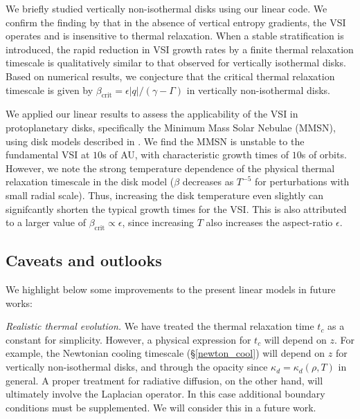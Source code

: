 We briefly studied vertically non-isothermal disks using our linear 
code. We confirm the finding by \cite{nelson13} that in the absence
of vertical entropy gradients, the VSI operates and is insensitive to
thermal relaxation. When a stable stratification is introduced, the
rapid reduction in VSI growth rates by a finite thermal relaxation
timescale is qualitatively similar to that observed for vertically
isothermal disks. Based on numerical results, we conjecture that the
critical thermal relaxation timescale is given by
$\beta_\mathrm{crit}=\epsilon|q|/(\gamma-\Gamma)$ in vertically 
non-isothermal disks.  


We applied our linear results to assess the applicability of the VSI in
protoplanetary disks, specifically the Minimum Mass Solar Nebulae (MMSN),
using disk models described in \cite{chiang10}. We find the MMSN is
unstable to the fundamental VSI at $10$s of AU, with characteristic
growth times of $10$s of orbits. However, we note the strong
temperature dependence of the physical thermal relaxation timescale
in the disk model ($\beta$ decreases as $T^{-5}$ for perturbations with small
radial scale). Thus, increasing the disk temperature even slightly can signifcantly 
shorten the typical growth times for the VSI. This is also attributed
to a larger value of $\beta_\mathrm{crit}\propto\epsilon$, since increasing $T$ also
increases the aspect-ratio $\epsilon$. 




\subsection{Caveats and outlooks} 
We highlight below some improvements to the present  
linear models in future works:  

\emph{Realistic thermal evolution.} We have treated the thermal
relaxation time $t_c$ as a constant for simplicity. However, a
physical expression for $t_c$ will depend on 
$z$. For example, the Newtonian cooling timescale
(\S\ref{newton_cool}) will depend on $z$ for vertically non-isothermal
disks, and through the opacity since 
$\kappa_d=\kappa_d(\rho,T)$ in general. 
A proper treatment for radiative diffusion, on the other hand, will
ultimately involve the Laplacian operator. In this case additional
boundary conditions must be supplemented. We will consider this in a
future work.  


